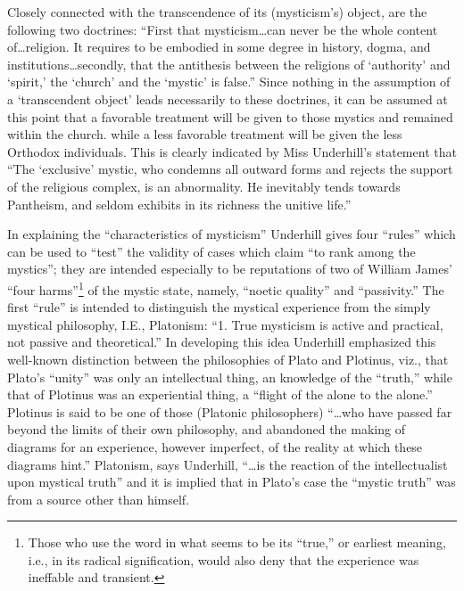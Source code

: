 Closely connected with the transcendence of its (mysticism's)
object, are the following two doctrines: \enquote{First that mysticism\dots can
never be the whole content of\dots religion. It requires
to be embodied in some degree in history, dogma, and
institutions\dots secondly, that the antithesis between the
religions of \enquote*{authority} and \enquote*{spirit,} the \enquote*{church} and
the \enquote*{mystic} is false.}\supercite{underhill:mysticism}
Since nothing in the assumption of a \enquote*{transcendent object} leads necessarily to these doctrines,
it can be assumed at this point that a favorable treatment
will be given to those mystics and remained within the
church. while a less favorable treatment will be
given the less Orthodox individuals. This is clearly indicated
by Miss Underhill's statement that \enquote{The \enquote*{exclusive} mystic,
who condemns all outward forms and rejects the support
of the religious complex, is an abnormality. He inevitably
tends towards Pantheism, and seldom exhibits in its richness
the unitive life.}\supercite{underhill:mysticism}

In explaining the \enquote{characteristics of mysticism} Underhill
gives four \enquote{rules} which can be used to \enquote{test} the
validity of cases which claim \enquote{to rank among the mystics};
they are intended especially to be reputations of two of
William James' \enquote{four harms}\footnote{Those who use the word in what seems to be its \enquote{true,} or earliest meaning, i.e., in its radical signification, would also deny that the experience was ineffable and transient.}
of the mystic state, namely, \enquote{noetic quality} and \enquote{passivity.} The first \enquote{rule} is intended
to distinguish the mystical experience from the
simply mystical philosophy, I.E., Platonism: \enquote{1. True
mysticism is active and practical, not passive and theoretical.}
In developing this idea Underhill emphasized this well-known
distinction between the philosophies of Plato and
Plotinus, viz., that Plato's \enquote{unity} was only an intellectual
thing, an knowledge of the \enquote{truth,} while that of Plotinus
was an experiential thing, a \enquote{flight of the alone to the alone.}\supercite{turnbull:essence-of-plotinus}
Plotinus is said to be one of those (Platonic
philosophers) \enquote{\dots who have passed far beyond the limits of
their own philosophy, and abandoned the making of diagrams
for an experience, however imperfect, of the reality at which
these diagrams hint.}\supercite{underhill:mysticism}
Platonism, says Underhill, \enquote{\dots is the reaction of the intellectualist upon mystical truth}\supercite{underhill:mysticism}
and it is implied that in Plato's case the \enquote{mystic truth} was from
a source other than himself.

